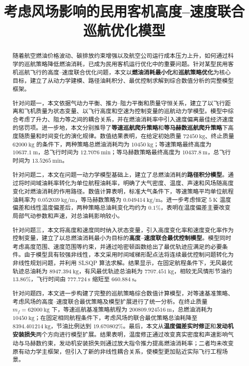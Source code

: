 \documentclass[withoutpreface,bwprint]{cumcmthesis} %
\title{考虑风场影响的民用客机高度--速度联合巡航优化模型}
\begin{document}
\maketitle
 \begin{abstract}
随着航空燃油价格波动、碳排放约束增强以及航空公司运行成本压力上升，如何通过科学的巡航策略降低燃油消耗，已成为民用客机运行优化中的重要问题。针对某型民用客机巡航飞行的高度--速度联合优化问题，本文以\textbf{燃油消耗最小化}和\textbf{巡航策略优化}为核心目标，建立了从动力学建模、路径油耗积分、最优控制求解到综合数值分析的完整模型框架。

针对问题一，本文依据气动力平衡、推力--阻力平衡和质量守恒关系，建立了以飞行距离和飞机质量为状态变量、以飞行高度和空速为控制变量的巡航动力学模型。模型中综合考虑了升力、阻力等之间的耦合关系，并在燃油消耗率中引入速度偏离最佳经济速度的惩罚项。进一步地，本文分别推导了\textbf{等速巡航爬升策略}和\textbf{等马赫数巡航爬升策略}下高度随质量和时间变化的演化规律。数值结果表明，在给定初始质量 $72450\ \mathrm{kg}$、终止质量 $62000\ \mathrm{kg}$ 的条件下，两种策略总燃油消耗均为 $10450\ \mathrm{kg}$；等速策略最终高度为 $10637.1\ \mathrm{m}$，总飞行时间为 $12.7076\ \mathrm{min}$；等马赫数策略最终高度为 $10437.8\ \mathrm{m}$，总飞行时间为 $13.5265\ \mathrm{min}$。

针对问题二，本文在问题一动力学模型基础上，建立了总燃油消耗的\textbf{路径积分模型}。通过将时间域油耗率转化为单位航程油耗率，明确了大气密度、温度、声速和风场随高度变化对燃油消耗的作用路径。数值计算表明，标准大气条件下，等速策略平均单位航程油耗率为 $0.052039\ \mathrm{kg/m}$，等马赫数策略为 $0.049414\ \mathrm{kg/m}$。进一步考虑恒定 $5\ \mathrm{K}$ 温度偏差和线性温度偏差后，两种策略总油耗变化均约为 $0.1\%$，表明在温度偏差主要改变局部气动参数和声速，对总油耗影响较小。

针对问题三，本文将高度和速度同时纳入状态变量，引入高度变化率和速度变化率作为控制变量，建立了以总燃油消耗最小为目标的\textbf{高度--速度联合最优控制模型}。模型同时考虑高度范围、速度范围等约束，并通过哈密顿函数给出了最优轨迹应满足的必要条件。由于模型具有较强非线性，本文采用时间域梯形配点法将连续最优控制问题转化为非线性规划问题，并利用 SLSQP 算法求解。结果显示，在固定航程条件下，无风最优轨迹总油耗为 $8947.394\ \mathrm{kg}$，有风最优轨迹总油耗为 $7707.451\ \mathrm{kg}$，相较无风情形节油约 $13.86\%$，飞行时间由 $777.724\ \mathrm{s}$ 缩短至 $660.884\ \mathrm{s}$。

针对问题四，本文进一步构建了完整的巡航策略综合数值计算模型，对等速基准策略、考虑风场的高度--速度联合最优策略及模型扩展进行了统一分析。在终止质量 $m_f=62000\ \mathrm{kg}$ 下，等速巡航基准策略航程为 $200809.924516\ \mathrm{m}$，总燃油消耗为 $10450\ \mathrm{kg}$；在固定相同航程条件下，考虑风场的联合最优策略总油耗降至 $8394.401214\ \mathrm{kg}$，节油比例达到 \textbf{$19.670802\%$}。最后，本文从\textbf{温度偏差实时修正}和\textbf{发动机安装损失}两个方向进行模型扩展。结果表明，温度修正通过改变真实密度和声速影响气动与马赫数约束，发动机安装损失则通过放大指令推力提高燃油消耗率；二者均未改变原有动力学主框架，但引入了新的非线性耦合关系，使模型更加贴近实际飞行工程场景。

\end{abstract}
\end{document}
